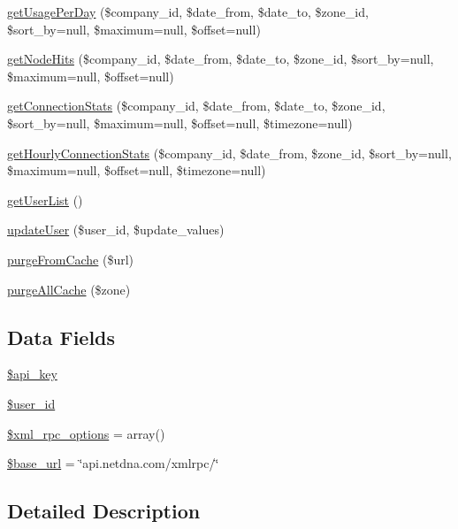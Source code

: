 \begin{DoxyCompactItemize}
\hyperlink{class_max_c_d_n_a0f0f34de0a9b9e8aee763a10620b0310}{getUsagePerDay} (\$company\_\-id, \$date\_\-from, \$date\_\-to, \$zone\_\-id, \$sort\_\-by=null, \$maximum=null, \$offset=null)
\item 
\hyperlink{class_max_c_d_n_a5edac3917b1fc456d9919a2b27954032}{getNodeHits} (\$company\_\-id, \$date\_\-from, \$date\_\-to, \$zone\_\-id, \$sort\_\-by=null, \$maximum=null, \$offset=null)
\item 
\hyperlink{class_max_c_d_n_a0ccdaad45884b8d37ec214a9fef96f69}{getConnectionStats} (\$company\_\-id, \$date\_\-from, \$date\_\-to, \$zone\_\-id, \$sort\_\-by=null, \$maximum=null, \$offset=null, \$timezone=null)
\item 
\hyperlink{class_max_c_d_n_a6a37fba9236e945837fdab2615463fd8}{getHourlyConnectionStats} (\$company\_\-id, \$date\_\-from, \$zone\_\-id, \$sort\_\-by=null, \$maximum=null, \$offset=null, \$timezone=null)
\item 
\hyperlink{class_max_c_d_n_aeb20dee182d29e6d339cab9682b4ff04}{getUserList} ()
\item 
\hyperlink{class_max_c_d_n_a1d86f2ee4963b6bfeb447979f58e8e0e}{updateUser} (\$user\_\-id, \$update\_\-values)
\item 
\hyperlink{class_max_c_d_n_a62a3e75f63fe9295ec761eaee62294fb}{purgeFromCache} (\$url)
\item 
\hyperlink{class_max_c_d_n_a1ffd352aec7f5cbd343401630382316b}{purgeAllCache} (\$zone)
\end{DoxyCompactItemize}
\subsection*{Data Fields}
\begin{DoxyCompactItemize}
\item 
\hyperlink{class_max_c_d_n_a186dfe06d14a3bc248c4eb4bcdaec562}{\$api\_\-key}
\item 
\hyperlink{class_max_c_d_n_af0fcd925f00973e32f7214859dfb3c6b}{\$user\_\-id}
\item 
\hyperlink{class_max_c_d_n_aa9300810e8d9adff7d3fdc176c218363}{\$xml\_\-rpc\_\-options} = array()
\item 
\hyperlink{class_max_c_d_n_a6886427c9c643f707fcb35c018049bc7}{\$base\_\-url} = \char`\"{}api.netdna.com/xmlrpc/\char`\"{}
\end{DoxyCompactItemize}


\subsection{Detailed Description}


